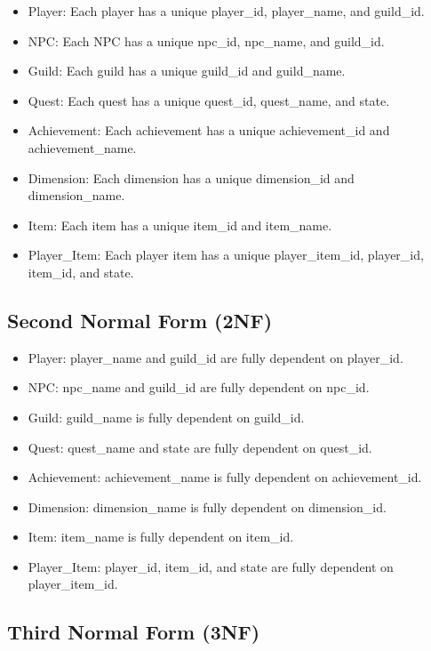 \documentclass{article}
\begin{document}
\begin{itemize}
    \item Player: Each player has a unique player\_id, player\_name, and guild\_id.
    \item NPC: Each NPC has a unique npc\_id, npc\_name, and guild\_id.
    \item Guild: Each guild has a unique guild\_id and guild\_name.
    \item Quest: Each quest has a unique quest\_id, quest\_name, and state.
    \item Achievement: Each achievement has a unique achievement\_id and achievement\_name.
    \item Dimension: Each dimension has a unique dimension\_id and dimension\_name.
    \item Item: Each item has a unique item\_id and item\_name.
    \item Player\_Item: Each player item has a unique player\_item\_id, player\_id, item\_id, and state.
\end{itemize}

\subsection{Second Normal Form (2NF)}

\begin{itemize}
    \item Player: player\_name and guild\_id are fully dependent on player\_id.
    \item NPC: npc\_name and guild\_id are fully dependent on npc\_id.
    \item Guild: guild\_name is fully dependent on guild\_id.
    \item Quest: quest\_name and state are fully dependent on quest\_id.
    \item Achievement: achievement\_name is fully dependent on achievement\_id.
    \item Dimension: dimension\_name is fully dependent on dimension\_id.
    \item Item: item\_name is fully dependent on item\_id.
    \item Player\_Item: player\_id, item\_id, and state are fully dependent on player\_item\_id.
\end{itemize}

\subsection{Third Normal Form (3NF)}
\end{document}
